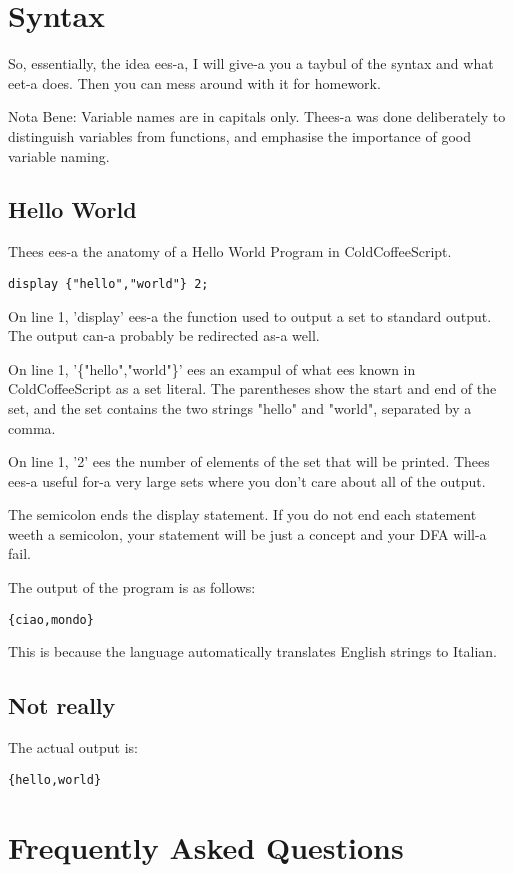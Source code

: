 \documentclass{article}
\begin{document}
\section{Syntax}
So, essentially, the idea ees-a, I will give-a you a taybul of the syntax and what eet-a does. Then you can mess around with it for homework.

Nota Bene: Variable names are in capitals only. Thees-a was done deliberately to distinguish variables from functions, and emphasise the importance of good variable naming.
\subsection{Hello World}
Thees ees-a the anatomy of a Hello World Program in ColdCoffeeScript.
\begin{lstlisting}
display {"hello","world"} 2;
\end{lstlisting}
On line 1, 'display' ees-a the function used to output a set to standard output. The output can-a probably be redirected as-a well.

On line 1, '\{"hello","world"\}' ees an exampul of what ees known in ColdCoffeeScript as a set literal. The parentheses show the start and end of the set, and the set contains the two strings "hello" and "world", separated by a comma.

On line 1, '2' ees the number of elements of the set that will be printed. Thees ees-a useful for-a very large sets where you don't care about all of the output.

The semicolon ends the display statement. If you do not end each statement weeth a semicolon, your statement will be just a concept and your DFA will-a fail.

The output of the program is as follows:
\begin{lstlisting}
{ciao,mondo}
\end{lstlisting}
This is because the language automatically translates English strings to Italian.
\newpage
\subsection{Not really}
The actual output is:
\begin{lstlisting}
{hello,world}
\end{lstlisting}
\section{Frequently Asked Questions}
\end{document}
